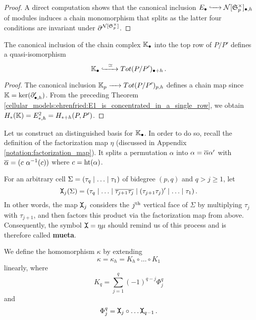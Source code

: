\begin{proof}
A direct computation shows that the canonical inclusion $E_\bullet \xhookrightarrow{\hspace{6pt}{}\hspace{6pt}} \mathcal N[\mathfrak S^\times_p]_{\bullet,h}$ of modules induces a chain monomorphism that splits
as the latter four conditions are invariant under $\partial^{\mathcal N[\mathfrak S^\times_p]}$.
\end{proof}

\begin{cor}
    \label{cellular_models:ehrenfried:KK_is_qi_subcomplex}
    The canonical inclusion of the chain complex $\mathbb K_\bullet$ into the top row of $P/P'$ defines a quasi-isomorphism
    \[
        \mathbb K_\bullet \xhookrightarrow{\hspace{6pt}{\simeq}\hspace{6pt}} Tot(P/P')_{\bullet + h} \,.
    \]
\end{cor}

\begin{proof}
    The canonical inclusion $\mathbb K_p \xrightarrow{\hspace{6pt}{}\hspace{6pt}} Tot(P/P')_{p,h}$ defines a chain map since $\mathbb K = \ker( \partial'_{\bullet,h} )$.
    From the preceding Theorem \ref{cellular_models:ehrenfried:E1_is_concentrated_in_a_single_row}, we obtain
    $H_\ast(\mathbb K) = E^2_{\ast,h} = H_{\ast+h}(P,P')$.
\end{proof}

Let us construct an distinguished basis for $\mathbb K_\bullet$.
In order to do so, recall the definition of the factorization map $\eta$ (discussed in Appendix \ref{notation:factorization_map}).
It splits a permutation $\alpha$ into $\alpha = \overline \alpha \alpha'$ with $\overline \alpha = ( c\ \alpha^{-1}(c))$ where $c = \operatorname{ht}(\alpha)$.

\begin{defi}
    \label{cellular_models:ehrenfried:mueta}
    For an arbitrary cell $\Sigma = \inhomq$ of bidegree $(p,q)$ and $q > j \ge 1$, let
    \[
        \mueta_j (\Sigma) = (\tau_q \mid \ldots \mid \ov{\tau_{j+1}\tau_j} \mid (\tau_{j+1}\tau_j)' \mid \ldots \mid \tau_1) \,.
    \]
    In other words, the map $\mueta_j$ considers the $j^{\text{th}}$ vertical face of $\Sigma$ by multiplying $\tau_j$ with $\tau_{j+1}$,
    and then factors this product via the factorization map from above.
    Consequently, the symbol $\mueta = \eta\mu$ should remind us of this process and is therefore called {\bfseries mueta}.
\end{defi}

\begin{defi}
    \label{cellular_models:ehrenfried:definition_kappa}
    We define the homomorphism $\kappa$ by extending
    \[
        \kappa = \kappa_h = K_h \circ \ldots \circ K_1
    \]
    linearly, where
    \[
        K_q = \sum_{j=1}^q (-1)^{q-j} \Phi_{j}^q
    \]
    and
    \[
        \Phi_j^q = \mueta_j \circ \ldots \mueta_{q-1} \,.
    \]
\end{defi}

